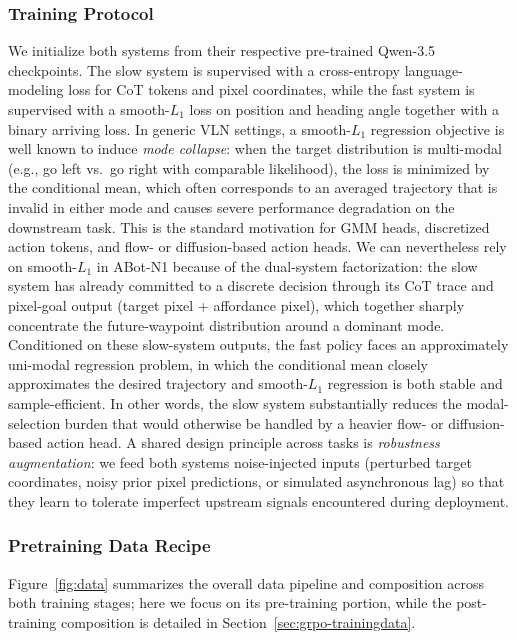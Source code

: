 \subsubsection{Training Protocol}
\label{sec:data-principles}

We initialize both systems from their respective pre-trained
Qwen-3.5 checkpoints. The slow system is supervised with a cross-entropy
language-modeling loss for CoT tokens and pixel coordinates, while the
fast system is supervised with a smooth-$L_1$ loss on position and
heading angle together with a binary arriving loss.  In generic VLN settings, a smooth-$L_1$ regression objective is
well known to induce \textit{mode collapse}: when the target
distribution is multi-modal (e.g., go left vs.\ go right with
comparable likelihood), the loss is minimized by the conditional
mean, which often corresponds to an averaged trajectory that is
invalid in either mode and causes severe performance degradation
on the downstream task. This is the standard motivation for GMM
heads, discretized action tokens, and flow- or diffusion-based
action heads. We can nevertheless rely on smooth-$L_1$ in
ABot-N1 because of the dual-system factorization: the slow
system has already committed to a discrete decision through its
CoT trace and pixel-goal output (target pixel + affordance
pixel), which together sharply concentrate the future-waypoint
distribution around a dominant mode. Conditioned on these
slow-system outputs, the fast policy faces an approximately
uni-modal regression problem, in which the conditional mean
closely approximates the desired trajectory and smooth-$L_1$
regression is both stable and sample-efficient. In other words,
the slow system substantially reduces the modal-selection burden
that would otherwise be handled by a heavier flow- or
diffusion-based action head.
 A shared design principle across
tasks is \textit{robustness augmentation}: we feed both systems
noise-injected inputs (perturbed target coordinates, noisy prior
pixel predictions, or simulated asynchronous lag) so that they learn
to tolerate imperfect upstream signals encountered during deployment.

\subsubsection{Pretraining Data Recipe}
\label{sec:data-tasks}

Figure~\ref{fig:data} summarizes the overall data pipeline and
composition across both training stages; here we focus on its
pre-training portion, while the post-training composition is detailed
in Section~\ref{sec:grpo-trainingdata}.

